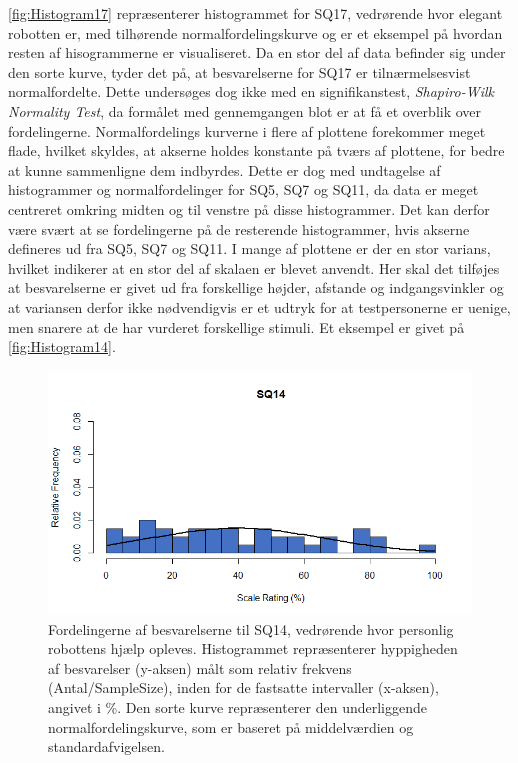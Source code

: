 \noindent
%
\autoref{fig:Histogram17} repræsenterer histogrammet for SQ17, vedrørende hvor elegant robotten er, med tilhørende normalfordelingskurve og er et eksempel på hvordan resten af hisogrammerne er visualiseret. Da en stor del af data befinder sig under den sorte kurve, tyder det på, at besvarelserne for SQ17 er tilnærmelsesvist normalfordelte. Dette undersøges dog ikke med en signifikanstest, \textit{Shapiro-Wilk Normality Test}, da formålet med gennemgangen blot er at få et overblik over fordelingerne.\blankline
%
Normalfordelings kurverne i flere af plottene forekommer meget flade, hvilket skyldes, at akserne holdes konstante på tværs af plottene, for bedre at kunne sammenligne dem indbyrdes. Dette er dog med undtagelse af histogrammer og normalfordelinger for SQ5, SQ7 og SQ11, da data er meget centreret omkring midten og til venstre på disse histogrammer. Det kan derfor være svært at se fordelingerne på de resterende histogrammer, hvis akserne defineres ud fra SQ5, SQ7 og SQ11.\blankline
%
I mange af plottene er der en stor varians, hvilket indikerer at en stor del af skalaen er blevet anvendt. Her skal det tilføjes at besvarelserne er givet ud fra forskellige højder, afstande og indgangsvinkler og at variansen derfor ikke nødvendigvis er et udtryk for at testpersonerne er uenige, men snarere at de har vurderet forskellige stimuli. Et eksempel er givet på \autoref{fig:Histogram14}.\blankline
%
\begin{figure}[H]
\centering
\includegraphics[width = \textwidth]{Figure/DatabehandlingSkalaer/HistogramNormalFordeling/SQ14} 
\caption{Fordelingerne af besvarelserne til SQ14, vedrørende hvor personlig robottens hjælp opleves. Histogrammet repræsenterer hyppigheden af besvarelser (y-aksen) målt som relativ frekvens (Antal/SampleSize), inden for de fastsatte intervaller (x-aksen), angivet i \%. Den sorte kurve repræsenterer den underliggende normalfordelingskurve, som er baseret på middelværdien og standardafvigelsen.}
\label{fig:Histogram14}
\end{figure}
